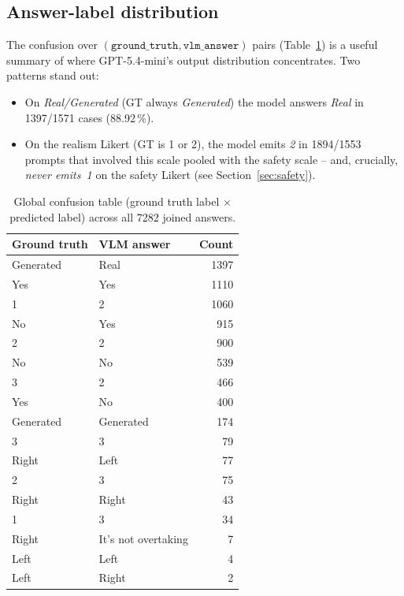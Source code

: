 \documentclass[11pt,a4paper]{article}
\newcommand{\pct}[1]{#1\,\%}
\begin{document}
\subsection{Answer-label distribution}

The confusion over \((\texttt{ground\_truth},\texttt{vlm\_answer})\) pairs
(Table~\ref{tab:confmat}) is a useful summary of where GPT-5.4-mini's
output distribution concentrates. Two patterns stand out:
\begin{itemize}
  \item On \emph{Real/Generated} (GT always \emph{Generated}) the
  model answers \emph{Real} in \num{1397}/\num{1571} cases
  (\pct{88.92}).
  \item On the realism Likert (GT is 1 or 2), the model emits
  \emph{2} in \num{1894}/\num{1553} prompts that involved this scale
  pooled with the safety scale -- and, crucially, \emph{never emits~1}
  on the safety Likert (see Section~\ref{sec:safety}).
\end{itemize}

\begin{table}[h]
\centering
\begin{tabular}{llr}
\toprule
Ground truth & VLM answer & Count \\
\midrule
Generated & Real                & \num{1397} \\
Yes       & Yes                 & \num{1110} \\
1         & 2                   & \num{1060} \\
No        & Yes                 & 915 \\
2         & 2                   & 900 \\
No        & No                  & 539 \\
3         & 2                   & 466 \\
Yes       & No                  & 400 \\
Generated & Generated           & 174 \\
3         & 3                   &  79 \\
Right     & Left                &  77 \\
2         & 3                   &  75 \\
Right     & Right               &  43 \\
1         & 3                   &  34 \\
Right     & It's not overtaking &   7 \\
Left      & Left                &   4 \\
Left      & Right               &   2 \\
\bottomrule
\end{tabular}
\caption{Global confusion table (ground truth label $\times$ predicted
label) across all 7282 joined answers.}
\label{tab:confmat}
\end{table}
\end{document}
